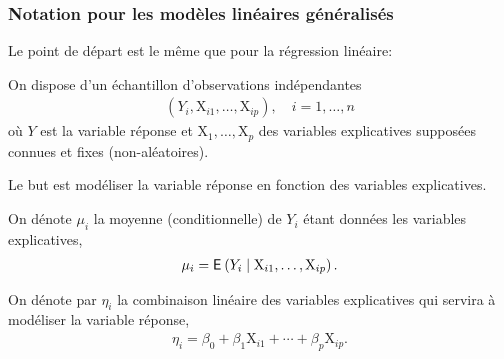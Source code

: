 \documentclass{beamer}
\begin{document}
\begin{frame}
\frametitle{Notation pour les modèles linéaires généralisés}
\bi
\item Le point de départ est le même que pour la régression linéaire:
\bi
 
\item On dispose
d'un échantillon d'observations indépendantes
\begin{align*}
(Y_i, \mathrm{X}_{i1}, \ldots, \mathrm{X}_{ip}), \quad i=1, \ldots, n
\end{align*}
où $Y$ est la variable réponse et $\mathrm{X}_1, \ldots, \mathrm{X}_p$ 
des variables explicatives supposées connues et fixes (non-aléatoires).
\item Le but est modéliser la variable réponse en fonction des variables explicatives.
\ei
\item On dénote $\mu_i$ la \alert{moyenne} (conditionnelle) de $Y_i$ étant données les variables explicatives,
\begin{align*}
\mu_i={\mathsf E}_{}\left(Y_i \mid  \mathrm{X}_{i1}, \ldots, \mathrm{X}_{ip}\right).
\end{align*}
\item On dénote par $\eta_i$ la \alert{combinaison linéaire} des variables explicatives qui servira à modéliser la
variable réponse, 
\begin{align*}
\eta_i=\beta_0 + \beta_1 \mathrm{X}_{i1} + \cdots + \beta_p \mathrm{X}_{ip}.
\end{align*}
\ei
\end{frame}
\end{document}
